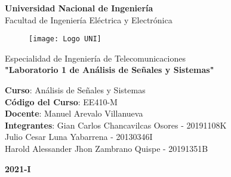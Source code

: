 \begin{titlepage}%
	\begin{center}
	 {\huge \textbf{Universidad Nacional de Ingeniería}}\\
	 \vspace{3mm}
	  {\Large {Facultad de Ingeniería Eléctrica y Electrónica}}\\
	\vspace{-5mm}	 
	 \begin{figure}[h]
	 	\centering 
	 	\texttt{[image: Logo UNI]}
	 \end{figure}
	 \vspace{-6mm}
	{\Large {Especialidad de Ingeniería de Telecomunicaciones}}\\
	\vspace{3mm}
	{\Large \textbf{"Laboratorio 1 de Análisis de Señales y Sistemas"}}\\
	\vspace{8mm}
	\begin{flushleft}
	{\Large {\textbf{Curso}: Análisis de Señales y Sistemas}}\\
	\vspace{8mm}		
	{\Large {\textbf{Código del Curso}: EE410-M}}\\	
	\vspace{8mm}	
	{\Large {\textbf{Docente}: Manuel Arevalo Villanueva}}\\
	\vspace{8mm}	
	{\Large {\textbf{Integrantes}: 
	Gian Carlos Chancavilcas Osores - 20191108K\\
	\vspace{4mm}
	\hspace{3cm}Julio Cesar Luna Yabarrena - 20130346I\\ 
	\vspace{4mm}
	\hspace{3cm}Harold Alessander Jhon Zambrano Quispe - 20191351B}}\\
	\vspace{8mm}	
	\end{flushleft}
	\vspace{10mm}
	{\Huge {\textbf{2021-I}}}\\
	\end{center}
\end{titlepage}
